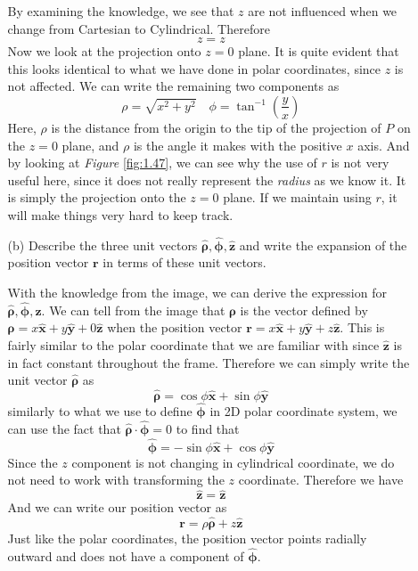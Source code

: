 \documentclass[12pt]{article}
\newcommand{\paren}[1]{\left( #1 \right)}
\newcommand{\unx}{\hat{\mathbf{x}}}
\newcommand{\uny}{\hat{\mathbf{y}}}
\newcommand{\unz}{\hat{\mathbf{z}}}
\newcommand{\unphi}{\hat{\boldsymbol\phi}}
\newcommand{\unrho}{\hat{\boldsymbol\rho}}
\begin{document}
\begin{enumerate}
\begin{itemize}
            By examining the knowledge, we see that $z$ are not influenced when we change from Cartesian to Cylindrical. Therefore
            \[
            z=z
            \]
            Now we look at the projection onto $z=0$ plane. It is quite evident that this looks identical to what we have done in polar coordinates, since $z$ is not affected. We can write the remaining two components as
            \[
            \rho = \sqrt{x^2 + y^2} \quad \phi = \tan^{-1}\paren{\frac{y}{x}}
            \]
            Here, $\rho$ is the distance from the origin to the tip of the projection of $P$ on the $z=0$ plane, and $\rho$ is the angle it makes with the positive $x$ axis. 
            And by looking at \textit{Figure} \ref{fig:1.47}, we can see why the use of $r$ is not very useful here, since it does not really represent the \textit{radius} as we know it. It is simply the projection onto the $z=0$ plane. If we maintain using $r$, it will make things very hard to keep track. 
            
            \item[(b)] Describe the three unit vectors \( \unrho, \unphi, \unz \) and write the expansion of the position vector \( \mathbf{r} \) in terms of these unit vectors.

            With the knowledge from the image, we can derive the expression for $\unrho, \unphi, \unz$. We can tell from the image that $\boldsymbol{\rho}$ is the vector defined by $\mathbf{\rho} = x\unx + y\uny + 0\unz$ when the position vector $\mathbf{r} = x\unx + y\uny + z\unz$. This is fairly similar to the polar coordinate that we are familiar with since $\unz$ is in fact constant throughout the frame. Therefore we can simply write the unit vector $\unrho$ as 
            \[
            \unrho = \cos\phi \unx + \sin\phi \uny
            \]
            similarly to what we use to define $\unphi$ in 2D polar coordinate system, we can use the fact that $\unrho \cdot \unphi = 0$ to find that
            \[
            \unphi = -\sin\phi \unx + \cos\phi \uny
            \]
            Since the $z$ component is not changing in cylindrical coordinate, we do not need to work with transforming the $z$ coordinate. Therefore we have
            \[
            \unz = \unz
            \]
            And we can write our position vector as
            \[
            \mathbf{r} = \rho\unrho + z\unz
            \]
            Just like the polar coordinates, the position vector points radially outward and does not have a component of $\unphi$.
            

\end{itemize}
\end{enumerate}
\end{document}
